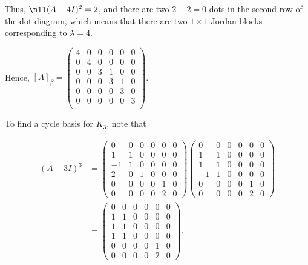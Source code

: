 \documentclass[11pt]{scrartcl}
\begin{document}
\begin{soln}
Thus, $\nll(A-4I)^2 = 2$, and there are two $2-2=0$ dots in the second row of the dot diagram, which means that there are two $1\times1$ Jordan blocks corresponding to $\lambda = 4$.

Hence, $[A]_{\beta} = 
\begin{pmatrix}
    4  & 0 & 0 & 0 & 0 & 0 \\
    0  & 4 & 0 & 0 & 0 & 0 \\
    0  & 0 & 3 & 1 & 0 & 0 \\
    0  & 0 & 0 & 3 & 1 & 0 \\
    0  & 0 & 0 & 0 & 3 & 0 \\
    0  & 0 & 0 & 0 & 0 & 3 \\
\end{pmatrix}$.

To find a cycle basis for $K_3$, note that

\begin{align}
\label{eq:3}
(A-3I)^3 & =
 \begin{pmatrix}
    0    & 0 & 0 & 0 & 0 & 0 \\
    1    & 1 & 0 & 0 & 0 & 0 \\
    -1   & 1 & 0 & 0 & 0 & 0 \\
    2    & 0 & 1 & 0 & 0 & 0 \\
    0    & 0 & 0 & 0 & 1 & 0 \\
    0    & 0 & 0 & 0 & 2 & 0
  \end{pmatrix}
  \begin{pmatrix}
    0    & 0 & 0 & 0 & 0 & 0 \\
    1    & 1 & 0 & 0 & 0 & 0 \\
    1    & 1 & 0 & 0 & 0 & 0 \\
    -1   & 1 & 0 & 0 & 0 & 0 \\
    0    & 0 & 0 & 0 & 1 & 0 \\
    0    & 0 & 0 & 0 & 2 & 0
  \end{pmatrix}              \\
         & =
  \begin{pmatrix}
    0    & 0 & 0 & 0 & 0 & 0 \\
    1    & 1 & 0 & 0 & 0 & 0 \\
    1    & 1 & 0 & 0 & 0 & 0 \\
    1   & 1 & 0 & 0 & 0 & 0 \\
    0    & 0 & 0 & 0 & 1 & 0 \\
    0    & 0 & 0 & 0 & 2 & 0
  \end{pmatrix}.
\end{align}


\end{soln}
\end{document}
